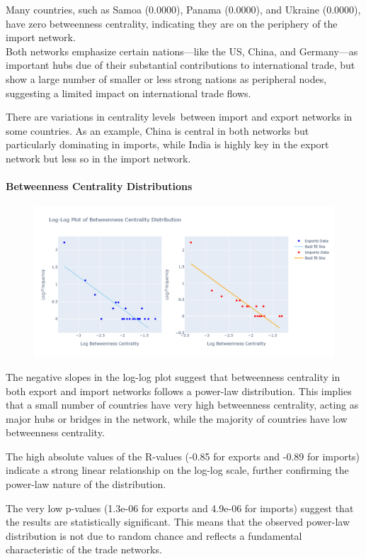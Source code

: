 \documentclass[12pt, a4paper]{article}
\begin{document}
Many countries, such as Samoa (0.0000), Panama (0.0000), and Ukraine (0.0000), have zero betweenness centrality, indicating they are on the periphery of the import network.\\
Both networks emphasize certain nations—like the US, China, and Germany—as important hubs due of their substantial contributions to international trade, but show a large number of smaller or less strong nations as peripheral nodes, suggesting a limited impact on international trade flows.

There are variations in centrality levels between import and export networks in some countries. As an example, China is central in both networks but particularly dominating in imports, while India is highly key in the export network but less so in the import network.
\paragraph{Betweenness Centrality Distributions}
\begin{figure}[ht]
\centering
\includegraphics[scale=0.4]{img/betweendist.png}
\label{fig:betweendist}
\end{figure}
The negative slopes in the log-log plot suggest that betweenness centrality in both export and import networks follows a power-law distribution. This implies that a small number of countries have very high betweenness centrality, acting as major hubs or bridges in the network, while the majority of countries have low betweenness centrality.

The high absolute values of the R-values (-0.85 for exports and -0.89 for imports) indicate a strong linear relationship on the log-log scale, further confirming the power-law nature of the distribution.

The very low p-values (1.3e-06 for exports and 4.9e-06 for imports) suggest that the results are statistically significant. This means that the observed power-law distribution is not due to random chance and reflects a fundamental characteristic of the trade networks.
\end{document}
